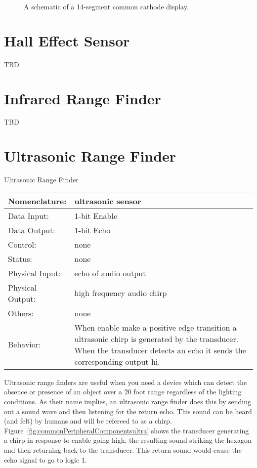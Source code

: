 \begin{figure}[ht]
\caption{A schematic of a 14-segment common cathode display.}
\label{fig:commonPeripheralComponentscommon}
\end{figure}


\section{Hall Effect Sensor}
TBD

\section{Infrared Range Finder}
TBD

\section{Ultrasonic Range Finder}
\label{page:ultrasonic}
\begin{buildingblock}{Ultrasonic Range Finder}
\begin{tabular}{|l|p{3.5in}|} \hline
Nomenclature:  & ultrasonic sensor  \\ \hline
Data Input:    & 1-bit Enable     \\ \hline
Data Output:   & 1-bit Echo   \\ \hline
Control:       & none           \\ \hline
Status:        & none                                   \\ \hline
Physical Input:& echo of audio output		\\ \hline
Physical Output:& high frequency audio chirp		\\ \hline
Others:        & none                   \\ \hline
Behavior:      & When enable make a positive edge transition
a ultrasonic chirp is generated by the transducer.  When the 
transducer detects an echo it sends the corresponding output hi. \\ \hline
\end{tabular}
\end{buildingblock}

Ultrasonic range finders are useful when you need a device which
can detect the absence or presence of an object over a 20 foot
range regardless of the lighting conditions.   As their name implies, 
an ultrasonic range finder does this by sending out a sound wave
and then listening for the return echo.  This sound can be heard (and
felt) by humans and will be refereed to as a chirp.
Figure~\ref{fig:commonPeripheralComponentsultra} shows the transducer generating a chirp in
response to enable going high, the resulting sound striking the 
hexagon and then returning back to the transducer.  This return
sound would cause the echo signal to go to logic 1.


